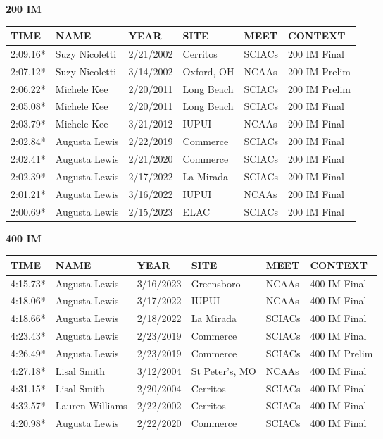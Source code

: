 \vspace{0.4cm}

\begin{minipage}[t]{0.48\textwidth}
\centering
\textbf{200 IM}\\[0.05cm]
\begin{tabular}{@{}p{1.8cm}p{2.8cm}p{1.2cm}p{1.4cm}p{1.4cm}p{2.0cm}@{}}
\hline
\textbf{TIME} & \textbf{NAME} & \textbf{YEAR} & \textbf{SITE} & \textbf{MEET} & \textbf{CONTEXT} \\
\hline
2:09.16* & Suzy Nicoletti & 2/21/2002 & Cerritos & SCIACs & 200 IM Final \\
2:07.12* & Suzy Nicoletti & 3/14/2002 & Oxford, OH & NCAAs & 200 IM Prelim \\
2:06.22* & Michele Kee & 2/20/2011 & Long Beach & SCIACs & 200 IM Prelim \\
2:05.08* & Michele Kee & 2/20/2011 & Long Beach & SCIACs & 200 IM Final \\
2:03.79* & Michele Kee & 3/21/2012 & IUPUI & NCAAs & 200 IM Final \\
2:02.84* & Augusta Lewis & 2/22/2019 & Commerce & SCIACs & 200 IM Final \\
2:02.41* & Augusta Lewis & 2/21/2020 & Commerce & SCIACs & 200 IM Final \\
2:02.39* & Augusta Lewis & 2/17/2022 & La Mirada & SCIACs & 200 IM Final \\
2:01.21* & Augusta Lewis & 3/16/2022 & IUPUI & NCAAs & 200 IM Final \\
2:00.69* & Augusta Lewis & 2/15/2023 & ELAC & SCIACs & 200 IM Final \\
\hline
\end{tabular}
\end{minipage}\hfill
\begin{minipage}[t]{0.48\textwidth}
\centering
\textbf{400 IM}\\[0.05cm]
\begin{tabular}{@{}p{1.8cm}p{2.8cm}p{1.2cm}p{1.4cm}p{1.4cm}p{2.0cm}@{}}
\hline
\textbf{TIME} & \textbf{NAME} & \textbf{YEAR} & \textbf{SITE} & \textbf{MEET} & \textbf{CONTEXT} \\
\hline
4:15.73* & Augusta Lewis & 3/16/2023 & Greensboro & NCAAs & 400 IM Final \\
4:18.06* & Augusta Lewis & 3/17/2022 & IUPUI & NCAAs & 400 IM Final \\
4:18.66* & Augusta Lewis & 2/18/2022 & La Mirada & SCIACs & 400 IM Final \\
4:23.43* & Augusta Lewis & 2/23/2019 & Commerce & SCIACs & 400 IM Final \\
4:26.49* & Augusta Lewis & 2/23/2019 & Commerce & SCIACs & 400 IM Prelim \\
4:27.18* & Lisal Smith & 3/12/2004 & St Peter's, MO & NCAAs & 400 IM Final \\
4:31.15* & Lisal Smith & 2/20/2004 & Cerritos & SCIACs & 400 IM Final \\
4:32.57* & Lauren Williams & 2/22/2002 & Cerritos & SCIACs & 400 IM Final \\
4:20.98* & Augusta Lewis & 2/22/2020 & Commerce & SCIACs & 400 IM Final \\
\hline
\end{tabular}
\end{minipage}

